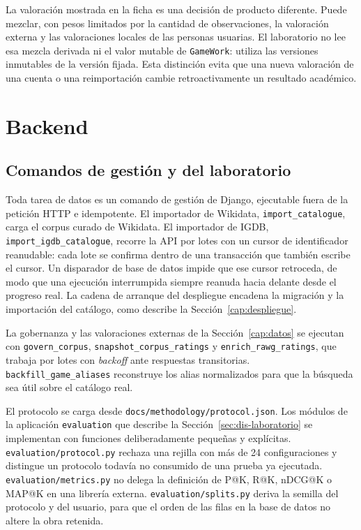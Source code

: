 La valoración mostrada en la ficha es una decisión de producto diferente. Puede mezclar,
con pesos limitados por la cantidad de observaciones, la valoración externa y las valoraciones
locales de las personas usuarias. El laboratorio no lee esa mezcla derivada ni el
valor mutable de \texttt{GameWork}: utiliza las versiones inmutables de la versión fijada. Esta
distinción evita que una nueva valoración de una cuenta o una reimportación cambie
retroactivamente un resultado académico.

\section{Backend}\label{sec:impl-backend}

\subsection{Comandos de gestión y del laboratorio}\label{sec:impl-comandos}

Toda tarea de datos es un comando de gestión de Django, ejecutable fuera de la petición HTTP e
idempotente. El importador de Wikidata, \texttt{import\_catalogue}, carga el corpus curado
de Wikidata. El importador de IGDB, \texttt{import\_igdb\_catalogue}, recorre la API por
lotes con un cursor de identificador reanudable: cada lote se confirma dentro de una
transacción que también escribe el cursor. Un disparador de base de datos impide que ese
cursor retroceda, de modo que una ejecución interrumpida siempre reanuda hacia delante desde
el progreso real. La cadena de arranque del despliegue encadena la migración y la importación del
catálogo, como describe la Sección~\ref{cap:despliegue}.

La gobernanza y las valoraciones externas de la Sección~\ref{cap:datos} se ejecutan con
\texttt{govern\_corpus}, \texttt{snapshot\_corpus\_ratings} y \texttt{enrich\_rawg\_ratings}, que
trabaja por lotes con \textit{backoff} ante respuestas transitorias.
\texttt{backfill\_game\_aliases} reconstruye los alias normalizados para que la búsqueda sea útil
sobre el catálogo real.

El protocolo se carga desde \texttt{docs/methodology/protocol.json}. Los módulos de la
aplicación \texttt{evaluation} que describe la Sección~\ref{sec:dis-laboratorio} se
implementan con funciones deliberadamente pequeñas y explícitas.
\texttt{evaluation/protocol.py} rechaza una rejilla con más de 24 configuraciones y distingue
un protocolo todavía no consumido de una prueba ya ejecutada. \texttt{evaluation/metrics.py} no
delega la definición de P@K, R@K, nDCG@K o MAP@K en una librería externa.
\texttt{evaluation/splits.py} deriva la semilla del protocolo y del usuario, para que el orden
de las filas en la base de datos no altere la obra retenida.

